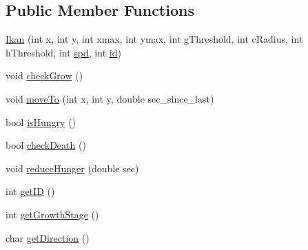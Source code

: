 \subsection*{Public Member Functions}
\begin{DoxyCompactItemize}
\item 
\mbox{\hyperlink{class_ikan_a0770a992c26f08ba3d9bad79fec71d55}{Ikan}} (int x, int y, int xmax, int ymax, int g\+Threshold, int c\+Radius, int h\+Threshold, int \mbox{\hyperlink{class_ikan_aac75c79c60a94f5607bdc2730203fd6f}{spd}}, int \mbox{\hyperlink{class_ikan_a9af33ebcd489980e17cbd4b876692e85}{id}})
\item 
void \mbox{\hyperlink{class_ikan_a68425d0df0528611318bdbef89aaf039}{check\+Grow}} ()
\item 
void \mbox{\hyperlink{class_ikan_af1b9d17721061771c7ea855b9c6e301d}{move\+To}} (int x, int y, double sec\+\_\+since\+\_\+last)
\item 
bool \mbox{\hyperlink{class_ikan_a893df179377af8174785228240eead8d}{is\+Hungry}} ()
\item 
bool \mbox{\hyperlink{class_ikan_a9a607ca1962b8f6029562e5571eaeb5c}{check\+Death}} ()
\item 
void \mbox{\hyperlink{class_ikan_aadb3eab63a3277d12d0cd4af5a9c96aa}{reduce\+Hunger}} (double sec)
\item 
int \mbox{\hyperlink{class_ikan_aa047dd2004a534353200f274e1541127}{get\+ID}} ()
\item 
int \mbox{\hyperlink{class_ikan_aa224e500b9f7c1f1e39b6045041a0d2f}{get\+Growth\+Stage}} ()
\item 
char \mbox{\hyperlink{class_ikan_af92d7548a85251152d24c6906c504298}{get\+Direction}} ()
\end{DoxyCompactItemize}
